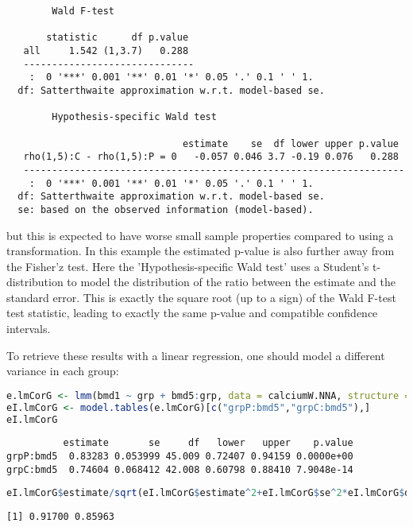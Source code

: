 \documentclass[12pt]{article}
\begin{document}
\label{}
\begin{verbatim}
		Wald F-test 

       statistic      df p.value  
   all     1.542 (1,3.7)   0.288  
   ------------------------------ 
    :  0 '***' 0.001 '**' 0.01 '*' 0.05 '.' 0.1 ' ' 1.
  df: Satterthwaite approximation w.r.t. model-based se. 

		Hypothesis-specific Wald test 

                               estimate    se  df lower upper p.value  
   rho(1,5):C - rho(1,5):P = 0   -0.057 0.046 3.7 -0.19 0.076   0.288  
   ------------------------------------------------------------------- 
    :  0 '***' 0.001 '**' 0.01 '*' 0.05 '.' 0.1 ' ' 1.
  df: Satterthwaite approximation w.r.t. model-based se. 
  se: based on the observed information (model-based).
\end{verbatim}

but this is expected to have worse small sample properties compared to
using a transformation. In this example the estimated p-value is also
further away from the Fisher'z test. Here the 'Hypothesis-specific
Wald test' uses a Student's t-distribution to model the distribution
of the ratio between the estimate and the standard error. This is
exactly the square root (up to a sign) of the Wald F-test test
statistic, leading to exactly the same p-value and compatible
confidence intervals.

\bigskip

To retrieve these results with a linear regression, one should model a
different variance in each group:
\begin{lstlisting}[language=r,numbers=none]
e.lmCorG <- lmm(bmd1 ~ grp + bmd5:grp, data = calciumW.NNA, structure = IND(~grp))
eI.lmCorG <- model.tables(e.lmCorG)[c("grpP:bmd5","grpC:bmd5"),]
eI.lmCorG
\end{lstlisting}

\label{}
\begin{verbatim}
          estimate       se     df   lower   upper    p.value
grpP:bmd5  0.83283 0.053999 45.009 0.72407 0.94159 0.0000e+00
grpC:bmd5  0.74604 0.068412 42.008 0.60798 0.88410 7.9048e-14
\end{verbatim}


\begin{lstlisting}[language=r,numbers=none]
eI.lmCorG$estimate/sqrt(eI.lmCorG$estimate^2+eI.lmCorG$se^2*eI.lmCorG$df)
\end{lstlisting}

\label{}
\begin{verbatim}
[1] 0.91700 0.85963
\end{verbatim}
\end{document}
